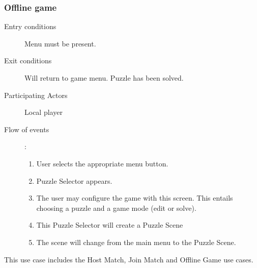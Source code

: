 \documentclass[12pt]{article}
\begin{document}
    \subsubsection{Offline game}
    \begin{description}
        \item[Entry conditions] Menu must be present.
        \item[Exit conditions] Will return to game menu. Puzzle has been
            solved.
        \item[Participating Actors] Local player
        \item[Flow of events]:
            \begin{enumerate}
                \item User selects the appropriate menu button.
                \item Puzzle Selector appears.
                \item The user may configure the game with this screen. This
                    entails choosing a puzzle and a game mode (edit or solve).
                \item This Puzzle Selector will create a Puzzle Scene
                \item The scene will change from the main menu to the Puzzle
                    Scene.
            \end{enumerate}
    \end{description}


    This use case includes the Host Match, Join Match and Offline Game
    use cases.
\end{document}
